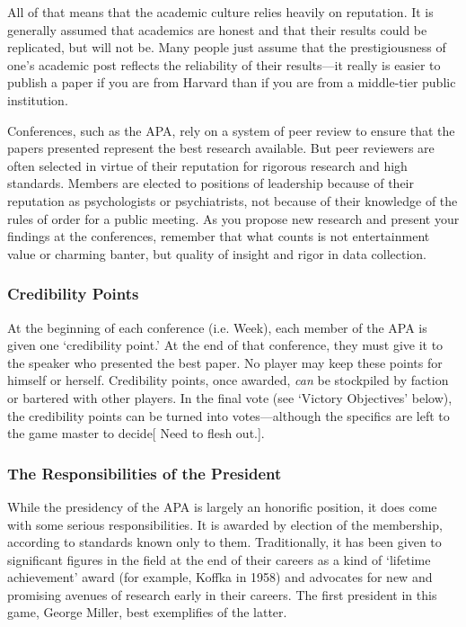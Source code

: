 All of that means that the academic culture relies heavily on reputation. It is generally assumed that academics are honest and that their results could be replicated, but will not be. Many people just assume that the prestigiousness of one's academic post reflects the reliability of their results---it really is easier to publish a paper if you are from Harvard than if you are from a middle-tier public institution.

Conferences, such as the APA, rely on a system of peer review to ensure that the papers presented represent the best research available. But peer reviewers are often selected in virtue of their reputation for rigorous research and high standards. Members are elected to positions of leadership because of their reputation as psychologists or psychiatrists, not because of their knowledge of the rules of order for a public meeting. As you propose new research and present your findings at the conferences, remember that what counts is not entertainment value or charming banter, but quality of insight and rigor in data collection.

\subsubsection{Credibility Points}
\label{credibilitypoints}

At the beginning of each conference (i.e. Week), each member of the APA is given one `credibility point.' At the end of that conference, they must give it to the speaker who presented the best paper. No player may keep these points for himself or herself. Credibility points, once awarded, \emph{can} be stockpiled by faction or bartered with other players. In the final vote (see `Victory Objectives' below), the credibility points can be turned into votes---although the specifics are left to the game master to decide[ Need to flesh out.]. 

\subsubsection{The Responsibilities of the President}
\label{theresponsibilitiesofthepresident}

While the presidency of the APA is largely an honorific position, it does come with some serious responsibilities. It is awarded by election of the membership, according to standards known only to them. Traditionally, it has been given to significant figures in the field at the end of their careers as a kind of `lifetime achievement' award (for example, Koffka in 1958) and advocates for new and promising avenues of research early in their careers. The first president in this game, George Miller, best exemplifies of the latter.

